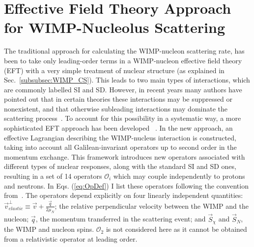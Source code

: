 \section{Effective Field Theory Approach for WIMP-Nucleolus Scattering}
\label{sec:intro_EFT}

The traditional approach for calculating the WIMP-nucleon scattering rate, has been to take only leading-order terms in a WIMP-nucleon effective field theory (EFT) with a very simple treatment of nuclear structure (as explained in Sec.~\ref{subsubsec:WIMP_CS}). This leads to two main types of interactions, which are commonly labelled SI and SD. However, in recent years many authors have pointed out that in certain theories these interactions may be suppressed or nonexistent, and that otherwise subleading interactions may dominate the scattering process~\cite{Chang:2009yt}. To account for this possibility in a systematic way, a more sophisticated EFT approach has been developed ~\cite{Fitzpatrick:2012ib,Anand:MathTools,Fitzpatrick:MathTools}. In the new approach, an effective Lagrangian describing the WIMP-nucleus interaction is constructed, taking into account all Galilean-invariant operators up to second order in the momentum exchange. This framework introduces new operators associated with different types of nuclear responses, along with the standard SI and SD ones, resulting in a set of 14 operators $\mathcal{O}_i$ which may couple independently to protons and neutrons. In Eqs. (\ref{eq:OpDef}) I list these operators following the convention from~\cite{Anand:MathTools}. The operators depend explicitly on four linearly independent quantities: $\vec{v}_{elastic}^{\perp} \equiv \vec{v} + \frac{\vec{q}}{2\mu_N} $; the relative perpendicular velocity between the WIMP and the nucleon; $\vec{q}$, the momentum transferred in the scattering event; and $\vec{S}_\chi$ and $\vec{S}_N$, the WIMP and nucleon spins. $\mathcal{O}_2$ is not considered here as it cannot be obtained from a relativistic operator at leading order.
%

